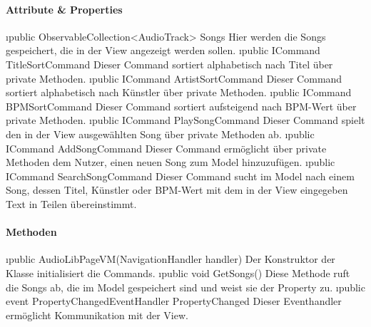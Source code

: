 \documentclass[../entwurf.tex]{subfiles}
\begin{document}
\paragraph{Attribute \& Properties}
\begin{itemize}
	\i{public ObservableCollection<AudioTrack> Songs} Hier werden die Songs gespeichert, die in der View angezeigt werden sollen.
	\i{public ICommand TitleSortCommand} Dieser Command sortiert  alphabetisch nach Titel über private Methoden. 
	\i{public ICommand ArtistSortCommand} Dieser Command sortiert  alphabetisch nach Künstler über private Methoden. 
	\i{public ICommand BPMSortCommand} Dieser Command sortiert  aufsteigend nach BPM-Wert über private Methoden. 
	\i{public ICommand PlaySongCommand} Dieser Command spielt den in der View ausgewählten Song über private Methoden ab. 
	\i{public ICommand AddSongCommand} Dieser Command ermöglicht über private Methoden dem Nutzer, einen neuen Song zum Model hinzuzufügen. 
	\i{public ICommand SearchSongCommand} Dieser Command sucht im Model nach einem Song, dessen Titel, Künstler oder BPM-Wert mit dem in der View eingegeben Text in Teilen übereinstimmt. 
\end{itemize}
\paragraph{Methoden}
\begin{itemize}
	\i{public AudioLibPageVM(NavigationHandler handler)} Der Konstruktor der Klasse initialisiert die Commands.
	\i{public void GetSongs()} Diese Methode ruft die Songs ab, die im Model gespeichert sind und weist sie der Property  zu.
	\i{public event PropertyChangedEventHandler PropertyChanged} Dieser Eventhandler ermöglicht Kommunikation mit der View.
\end{itemize}
\end{document}
